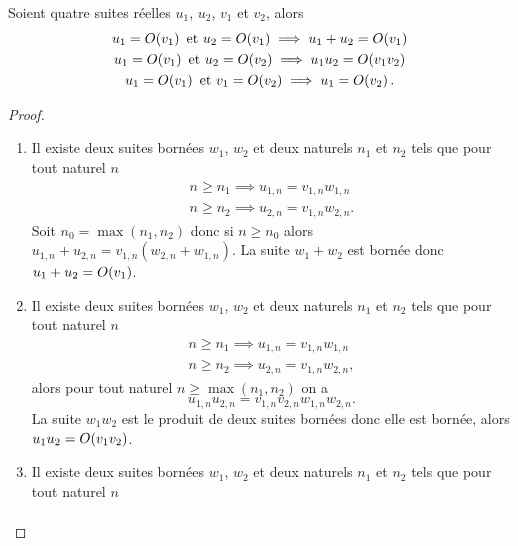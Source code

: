 \begin{prop}
    Soient quatre suites réelles \(u_1\), \(u_2\), \(v_1\) et \(v_2\), alors
    \begin{gather}
        u_1 = O\mathopen{}\left(v_1\right) \text{~et~} u_2 = O\mathopen{}\left(v_1\right) \implies u_1+u_2 =
        O\mathopen{}\left(v_1\right)\\
        u_1 = O\mathopen{}\left(v_1\right) \text{~et~} u_2 = O\mathopen{}\left(v_2\right) \implies u_1u_2 =
        O\mathopen{}\left(v_1 v_2\right)\\
        u_1 = O\mathopen{}\left(v_1\right) \text{~et~} v_1 = O\mathopen{}\left(v_2\right) \implies u_1 =
        O\mathopen{}\left(v_2\right).
    \end{gather}
\end{prop}
\begin{proof}
    \begin{enumerate}
        \item Il existe deux suites bornées \(w_1\), \(w_2\) et deux naturels
            \(n_1\) et \(n_2\) tels que pour tout naturel \(n\)
            \begin{align}
                n \geqslant n_1 \implies u_{1,n} = v_{1,n}w_{1,n} \\
                n \geqslant n_2 \implies u_{2,n} = v_{1,n}w_{2,n}.
            \end{align}
            Soit \(n_0 = \max(n_1,n_2)\) donc si \(n \geqslant n_0\) alors \(u_{1,n} +
            u_{2,n}= v_{1,n} (w_{2,n}+w_{1,n})\). La suite \(w_{1} + w_{2}\) est
            bornée donc \(u_1+u_2 = O\mathopen{}\left(v_1\right)\).
        \item Il existe deux suites bornées \(w_1\), \(w_2\) et deux naturels
            \(n_1\) et \(n_2\) tels que pour tout naturel \(n\)
            \begin{align}
                n \geqslant n_1 \implies u_{1,n} = v_{1,n}w_{1,n} \\
                n \geqslant n_2 \implies u_{2,n} = v_{1,n}w_{2,n},
            \end{align}
            alors pour tout naturel \(n \geqslant \max(n_1,n_2)\) on a
            \begin{equation}
                u_{1,n} u_{2,n} = v_{1,n} v_{2,n} w_{1,n} w_{2,n}.
            \end{equation}
            La suite \(w_1 w_2\) est le produit de deux suites bornées donc elle est
            bornée, alors \(u_1u_2 = O\mathopen{}\left(v_1v_2\right)\).
        \item Il existe deux suites bornées \(w_1\), \(w_2\) et deux naturels
            \(n_1\) et \(n_2\) tels que pour tout naturel \(n\) \begin{align}

\end{align}
\end{enumerate}
\end{proof}

